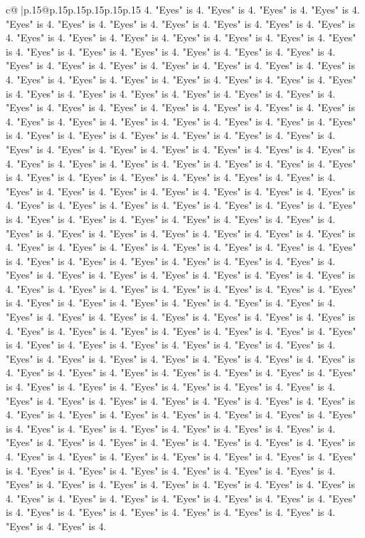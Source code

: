 \documentclass{article}
\begin{document}
{\begin{supertabular}{c@{$\;$}|p{.15\linewidth}@{}p{.15\linewidth}p{.15\linewidth}p{.15\linewidth}p{.15\linewidth}p{.15\linewidth}}
{{{4. "Eyes" is 4. "Eyes" is 4. "Eyes" is 4. "Eyes" is 4. "Eyes" is 4. "Eyes" is 4. "Eyes" is 4. "Eyes" is 4. "Eyes" is 4. "Eyes" is 4. "Eyes" is 4. "Eyes" is 4. "Eyes" is 4. "Eyes" is 4. "Eyes" is 4. "Eyes" is 4. "Eyes" is 4. "Eyes" is 4. "Eyes" is 4. "Eyes" is 4. "Eyes" is 4. "Eyes" is 4. "Eyes" is 4. "Eyes" is 4. "Eyes" is 4. "Eyes" is 4. "Eyes" is 4. "Eyes" is 4. "Eyes" is 4. "Eyes" is 4. "Eyes" is 4. "Eyes" is 4. "Eyes" is 4. "Eyes" is 4. "Eyes" is 4. "Eyes" is 4. "Eyes" is 4. "Eyes" is 4. "Eyes" is 4. "Eyes" is 4. "Eyes" is 4. "Eyes" is 4. "Eyes" is 4. "Eyes" is 4. "Eyes" is 4. "Eyes" is 4. "Eyes" is 4. "Eyes" is 4. "Eyes" is 4. "Eyes" is 4. "Eyes" is 4. "Eyes" is 4. "Eyes" is 4. "Eyes" is 4. "Eyes" is 4. "Eyes" is 4. "Eyes" is 4. "Eyes" is 4. "Eyes" is 4. "Eyes" is 4. "Eyes" is 4. "Eyes" is 4. "Eyes" is 4. "Eyes" is 4. "Eyes" is 4. "Eyes" is 4. "Eyes" is 4. "Eyes" is 4. "Eyes" is 4. "Eyes" is 4. "Eyes" is 4. "Eyes" is 4. "Eyes" is 4. "Eyes" is 4. "Eyes" is 4. "Eyes" is 4. "Eyes" is 4. "Eyes" is 4. "Eyes" is 4. "Eyes" is 4. "Eyes" is 4. "Eyes" is 4. "Eyes" is 4. "Eyes" is 4. "Eyes" is 4. "Eyes" is 4. "Eyes" is 4. "Eyes" is 4. "Eyes" is 4. "Eyes" is 4. "Eyes" is 4. "Eyes" is 4. "Eyes" is 4. "Eyes" is 4. "Eyes" is 4. "Eyes" is 4. "Eyes" is 4. "Eyes" is 4. "Eyes" is 4. "Eyes" is 4. "Eyes" is 4. "Eyes" is 4. "Eyes" is 4. "Eyes" is 4. "Eyes" is 4. "Eyes" is 4. "Eyes" is 4. "Eyes" is 4. "Eyes" is 4. "Eyes" is 4. "Eyes" is 4. "Eyes" is 4. "Eyes" is 4. "Eyes" is 4. "Eyes" is 4. "Eyes" is 4. "Eyes" is 4. "Eyes" is 4. "Eyes" is 4. "Eyes" is 4. "Eyes" is 4. "Eyes" is 4. "Eyes" is 4. "Eyes" is 4. "Eyes" is 4. "Eyes" is 4. "Eyes" is 4. "Eyes" is 4. "Eyes" is 4. "Eyes" is 4. "Eyes" is 4. "Eyes" is 4. "Eyes" is 4. "Eyes" is 4. "Eyes" is 4. "Eyes" is 4. "Eyes" is 4. "Eyes" is 4. "Eyes" is 4. "Eyes" is 4. "Eyes" is 4. "Eyes" is 4. "Eyes" is 4. "Eyes" is 4. "Eyes" is 4. "Eyes" is 4. "Eyes" is 4. "Eyes" is 4. "Eyes" is 4. "Eyes" is 4. "Eyes" is 4. "Eyes" is 4. "Eyes" is 4. "Eyes" is 4. "Eyes" is 4. "Eyes" is 4. "Eyes" is 4. "Eyes" is 4. "Eyes" is 4. "Eyes" is 4. "Eyes" is 4. "Eyes" is 4. "Eyes" is 4. "Eyes" is 4. "Eyes" is 4. "Eyes" is 4. "Eyes" is 4. "Eyes" is 4. "Eyes" is 4. "Eyes" is 4. "Eyes" is 4. "Eyes" is 4. "Eyes" is 4. "Eyes" is 4. "Eyes" is 4. "Eyes" is 4. "Eyes" is 4. "Eyes" is 4. "Eyes" is 4. "Eyes" is 4. "Eyes" is 4. "Eyes" is 4. "Eyes" is 4. "Eyes" is 4. "Eyes" is 4. "Eyes" is 4. "Eyes" is 4. "Eyes" is 4. "Eyes" is 4. "Eyes" is 4. "Eyes" is 4. "Eyes" is 4. "Eyes" is 4. "Eyes" is 4. "Eyes" is 4. "Eyes" is 4. "Eyes" is 4. "Eyes" is 4. "Eyes" is 4. "Eyes" is 4. "Eyes" is 4. "Eyes" is 4. "Eyes" is 4. "Eyes" is 4. "Eyes" is 4. "Eyes" is 4. "Eyes" is 4. "Eyes" is 4. "Eyes" is 4. "Eyes" is 4. "Eyes" is 4. "Eyes" is 4. "Eyes" is 4. "Eyes" is 4. "Eyes" is 4. "Eyes" is 4. "Eyes" is 4. "Eyes" is 4. "Eyes" is 4. "Eyes" is 4. "Eyes" is 4. "Eyes" is 4. "Eyes" is 4. "Eyes" is 4. "Eyes" is 4. "Eyes" is 4. "Eyes" is 4. "Eyes" is 4. "Eyes" is 4. "Eyes" is 4. "Eyes" is 4. "Eyes" is 4. "Eyes" is 4. "Eyes" is 4. "Eyes" is 4. "Eyes" is 4. "Eyes" is 4. "Eyes" is 4. "Eyes" is 4. "Eyes" is 4. "Eyes" is 4. "Eyes" is 4. "Eyes" is 4. "Eyes" is 4. "Eyes" is 4. "Eyes" is 4. }}}
\end{supertabular}}
\end{document}
